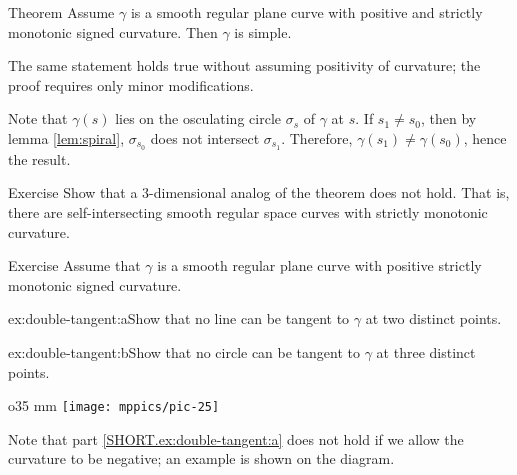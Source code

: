 \begin{thm}{Theorem}\label{thm:spiral}
Assume $\gamma$ is a smooth regular plane curve with positive and strictly monotonic signed curvature. 
Then $\gamma$ is simple.
\end{thm}

The same statement holds true without assuming positivity of curvature; the proof requires only minor modifications.

Note that $\gamma(s)$ lies on the osculating circle $\sigma_s$ of $\gamma$ at $s$.
If $s_1\ne s_0$, then by lemma \ref{lem:spiral}, $\sigma_{s_0}$ does not intersect $\sigma_{s_1}$.
Therefore, $\gamma(s_1)\ne \gamma(s_0)$,
hence the result.\qeds

\begin{thm}{Exercise}\label{ex:3D-spiral}
Show that a 3-dimensional analog of the theorem does not hold.
That is, there are self-intersecting smooth regular space curves with strictly monotonic curvature.
\end{thm}

\begin{thm}{Exercise}\label{ex:double-tangent}
Assume that $\gamma$ is a smooth regular plane curve with positive strictly monotonic signed curvature.

\begin{subthm}{ex:double-tangent:a}Show that no line can be tangent to $\gamma$ at two distinct points.
\end{subthm}

\begin{subthm}{ex:double-tangent:b}Show that no circle can be tangent to $\gamma$ at three distinct points. 
\end{subthm}

\end{thm}

{

\begin{wrapfigure}{o}{35 mm}
\vskip-4mm
\centering
\texttt{[image: mppics/pic-25]}
\vskip0mm
\end{wrapfigure}

Note that part \ref{SHORT.ex:double-tangent:a} does not hold if we allow the curvature to be negative; an example is shown on the diagram.

}



